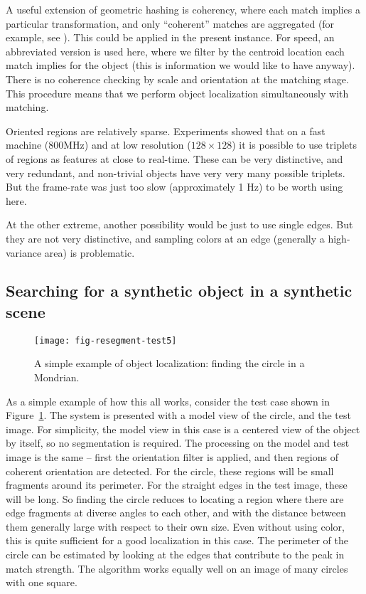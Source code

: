 
A useful extension of geometric hashing is coherency, where
each match implies a particular transformation, and only ``coherent''
matches are aggregated (for example, see \cite{lamiroy96rapid}).
%
This could be applied in the present instance.  For speed, an
abbreviated version is used here, where we filter by the centroid
location each match implies for the object (this is information we
would like to have anyway).  There is no coherence checking by scale
and orientation at the matching stage.  
%
This procedure means that we perform object localization
simultaneously with matching.

Oriented regions are relatively sparse.  Experiments showed that on a
fast machine (800MHz) and at low resolution ($128\times 128$) it is
possible to use triplets of regions as features at close to real-time.
These can be very distinctive, and very redundant, and non-trivial
objects have very very many possible triplets.  But the frame-rate
was just too slow (approximately 1 Hz) to be worth using here.

At the other extreme, another possibility would be just to use single
edges.  But they are not very distinctive, and sampling colors at an
edge (generally a high-variance area) is problematic.


\subsection{Searching for a synthetic object in a synthetic scene}


\begin{figure}[tb]
\centerline{\texttt{[image: fig-resegment-test5]}}
\caption[Another example]{ 
%
%
A simple example of object localization: finding the circle in a
Mondrian.  
%
}
\label{fig:resegment-mondrian}
\end{figure}


As a simple example of how this all works,
consider the test case shown in Figure~\ref{fig:resegment-mondrian}.
The system is presented with a model view of the
circle, and the test image.  For simplicity, the model view in 
this case is a centered view of the object by itself, so no
segmentation is required.  The processing on the model and
test image is the same -- first the orientation filter is applied, and
then regions of coherent orientation are detected.
For the circle, these regions will be small fragments around its
perimeter.  For the straight edges in the test image, these will
be long.  So finding the circle reduces to locating a region
where there are edge fragments at diverse angles to each other,
and with the distance between them generally large with respect
to their own size.  Even without using color, this is quite sufficient
for a good localization in this case.  The perimeter
of the circle can be estimated by looking at the edges that
contribute to the peak in match strength.
The algorithm works equally well on an image of many circles
with one square.



